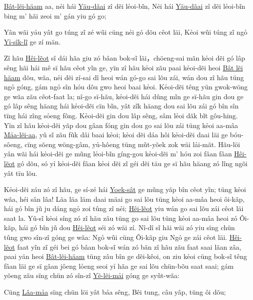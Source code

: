 \documentclass[twoside,twocolumn,a4paper,10pt]{memoir}
\begin{document}
\begin{scripture}
  \begin{poetry}
  	\underline{Bât-lẽi-häam} aa, nẻi hái \underline{Yäu-dãai} zî dẽi lẻoi-bĩn,
	  Nẻi hái \underline{Yäu-dãai} zî dẽi lẻoi-bĩn bing m' hãi zeoi m' gán yiu	gó go;
  
  Yân wãi yảu yât go túng zĩ zé wũi cüng nẻi gó dõu cêot läi,
  Kẻoi wũi túng zĩ ngỏ \underline{Yỉ-sîk-lĩ} ge zí män.
\end{poetry}
  
  Zî hãu \underline{Hêi-lẽot} sî dái hãa giu zó bâan bok-sĩ läi，chöeng-sai mãn kẻoi dẽi gó lâp sêng hãi hái mê sï hãu cêot yĩn ge, yïn zî hãu kẻoi zãu paai kẻoi-dẽi heoi \underline{Bât lẽi häam} dõu, wãa, nẻi dẽi zí-sai dî heoi wán gó-go sai lõu zái, wán dou zî hãu tüng ngỏ góng, gám ngỏ sîn hóu dôu gwo heoi baai kẻoi.  
  Kẻoi-dẽi têng yün gwok-wöng ge wãa zãu cêot-faat la; nî-go sï-hãu, kẻoi-dẽi hái dûng mĩn ge sï-hãu gin dou ge gó lâp sêng häang hái kẻoi-dẽi cïn bĩn, yât zĩk häang dou sai lõu zái gó bîn sîn tïng hái zîng sỏeng fông.
  Kẻoi-dẽi gin dou lâp sêng, sâm lẻoi dãk bĩt gôu-hing.
  Yïn zî hãu kẻoi-dẽi yãp dou gâan fóng gin dou go sai lõu zái tüng kẻoi aa-mâa \underline{Mảa-lẽi-aa}, yû sĩ zãu fũk dâi baai kẻoi; kẻoi dẽi dáa hôi kẻoi-dẽi daai läi ge bóu-sôeng, cïng sõeng wöng-gâm, yủ-hôeng tüng mũt-yõek zok wäi lải-mãt.
  	Hãu-löi yân wãi  hái kẻoi-dẽi ge mũng lẻoi-bĩn gíng-gou kẻoi-dẽi m' hóu zoi fâan fâan \underline{Hêi-lẽot} gó dõu, só yỉ kẻoi-dẽi fâan kẻoi dẽi zĩ géi dẽi täu ge sï hãu häang zó lĩng ngõi yât tïu lõu.
  	
  	Kẻoi-dẽi záu zó zî hãu,  ge sí-zé hái \underline{Yoek-sât} ge mũng yãp bîn cêot yĩn; tüng kẻoi wãa, héi sân lâa! Läa läa läm daai mäai go sai lõu tüng kẻoi aa-mâa heoi ôi-kãp, hái gó bîn jũ ju dáng ngỏ zoi tûng zî nẻi; \underline{Hêi-lẽot} yiu wán go sai lõu zái cêot läi saat la.
  	Yû-sĩ kẻoi síng zó zî hãu zãu tüng go sai lõu tüng kẻoi aa-mâa heoi zó Ôi-kãp,
  	hái gó bîn jũ dou \underline{Hêi-lẽot} séi zó wäi zí. Nî-dî sĩ hãi wäi zó yiu sïng chün  tûng gwo sîn-zî góng ge wãa: Ngỏ wũi cüng Ôi-kãp giu Ngỏ ge zái cêot läi.
  	\underline{Hêi-lẽot} faat yĩn zĩ géi bei gó bâan bok-sĩ wán zó bãn zî hãu zãu faat saai lãan zâa, paai yän heoi \underline{Bât-lẽi-häam} tüng zâu bîn ge dẽi-kêoi, on ziu kẻoi cüng bok-sĩ têng fâan läi ge sï gâan jôeng lỏeng seoi yỉ hãa ge sai lõu chün-bõu saat saai; 
  	gám yõeng zãu sïng chün zó sîn-zî \underline{Yë-lẽi-mải} góng ge syũt-wãa:
  	\begin{poetry}
  		Cüng \underline{Lâa-mảa} sïng chün löi yât báa sêng,
  		Bêi tung, câu yâp, tüng ôi dõu;
  		

\end{poetry}
\end{scripture}
\end{document}
